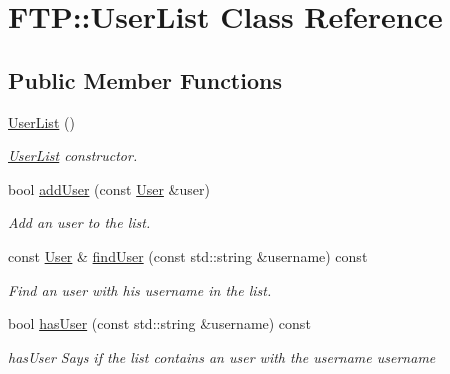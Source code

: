 \hypertarget{class_f_t_p_1_1_user_list}{\section{F\-T\-P\-:\-:User\-List Class Reference}
\label{class_f_t_p_1_1_user_list}
}
\subsection*{Public Member Functions}
\begin{DoxyCompactItemize}
\item 
\hypertarget{class_f_t_p_1_1_user_list_af2f3d0d0df23f6a00bea95f0be707601}{\hyperlink{class_f_t_p_1_1_user_list_af2f3d0d0df23f6a00bea95f0be707601}{User\-List} ()}\label{class_f_t_p_1_1_user_list_af2f3d0d0df23f6a00bea95f0be707601}

\begin{DoxyCompactList}\small\item\em \hyperlink{class_f_t_p_1_1_user_list}{User\-List} constructor. \end{DoxyCompactList}\item 
bool \hyperlink{class_f_t_p_1_1_user_list_a0427b71d7f5c0ed383cb6254f36d210c}{add\-User} (const \hyperlink{struct_f_t_p_1_1_user}{User} \&user)
\begin{DoxyCompactList}\small\item\em Add an user to the list. \end{DoxyCompactList}\item 
const \hyperlink{struct_f_t_p_1_1_user}{User} \& \hyperlink{class_f_t_p_1_1_user_list_a260d4aa185854aefa9266e762fb5a0dc}{find\-User} (const std\-::string \&username) const 
\begin{DoxyCompactList}\small\item\em Find an user with his username in the list. \end{DoxyCompactList}\item 
bool \hyperlink{class_f_t_p_1_1_user_list_a9b6441c5595dbdcdd872d4c3182da44a}{has\-User} (const std\-::string \&username) const 
\begin{DoxyCompactList}\small\item\em has\-User Says if the list contains an user with the username username \end{DoxyCompactList}\end{DoxyCompactItemize}


